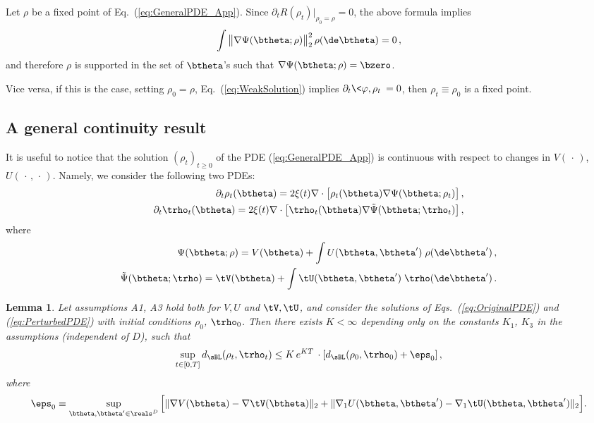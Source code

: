 \documentclass[11pt]{article}
\newtheorem{lemma}{Lemma}
\begin{document}
Let $\rho$ be a fixed point of Eq.~(\ref{eq:GeneralPDE_App}).  Since $\partial_tR(\rho_t)|_{\rho_0=\rho}=0$, the above formula implies
%
\begin{align}
%
\int \big\|\nabla \Psi(\btheta;\rho)\big\|_2^2\,\rho(\de\btheta) = 0\, ,
%
\end{align}
%
and therefore $\rho$ is supported in the set of $\btheta$'s such that $\nabla \Psi(\btheta;\rho)=\bzero$.

Vice versa, if this is the case, setting $\rho_0=\rho$,  Eq.~(\ref{eq:WeakSolution}) implies $\partial_t\<\varphi,\rho_t\> = 0$, then $\rho_t \equiv \rho_0$ is a fixed point.

\subsection{A general continuity result}

It is useful to notice that the solution $(\rho_t)_{t\ge 0}$ of the PDE (\ref{eq:GeneralPDE_App}) is continuous with respect to changes in $V(\, \cdot\,)$, $U(\,\cdot\,,\,\cdot\,)$. 
Namely, we consider the following two PDEs:
\begin{align}
\partial_t\rho_t(\btheta) =  2 \xi(t) \nabla\cdot \big[\rho_t(\btheta)\nabla \Psi(\btheta;\rho_t)\big]\,, \label{eq:OriginalPDE}\\
\partial_t\trho_t(\btheta) =  2 \xi(t) \nabla\cdot \big[\trho_t(\btheta)\nabla\tilde\Psi(\btheta;\trho_t)\big]\,, \label{eq:PerturbedPDE}
\end{align}
where
\begin{align}
\Psi(\btheta;\rho) = V(\btheta)+ \int U(\btheta, \btheta')\; \rho(\de\btheta')\, ,\\
\tilde\Psi(\btheta;\trho) = \tV(\btheta)+ \int \tU(\btheta, \btheta')\; \trho(\de\btheta')\,.
\end{align}

\begin{lemma}\label{lem:perturbation_convergence}
Let assumptions {\sf A1}, {\sf A3} hold both for $V,U$ and $\tV,\tU$, and consider the solutions of  Eqs.~(\ref{eq:OriginalPDE}) and (\ref{eq:PerturbedPDE})
with initial conditions $\rho_0$, $\trho_0$. Then there exists  $K< \infty$ depending only on the constants $K_1$, $K_3$ in the assumptions
 (independent of $D$), such that
%
\begin{align}
%
 \sup_{t \in [0, T]} d_{\sBL}(\rho_t,\trho_t) \le K\, e^{KT}\,\cdot [ d_{\sBL}(\rho_0, \trho_0) + \eps_0] \, ,
%
\end{align}
where
\begin{align}\label{eqn:perturbation_error_in_perturbation_lemma}
\eps_0 \equiv \sup_{\btheta, \btheta' \in \reals^D} \Big[ \| \nabla V(\btheta) - \nabla \tV(\btheta) \|_2 + \| \nabla_1 U(\btheta, \btheta') - \nabla_1 \tU(\btheta, \btheta') \|_2 \Big]. 
\end{align}
\end{lemma}
\end{document}
